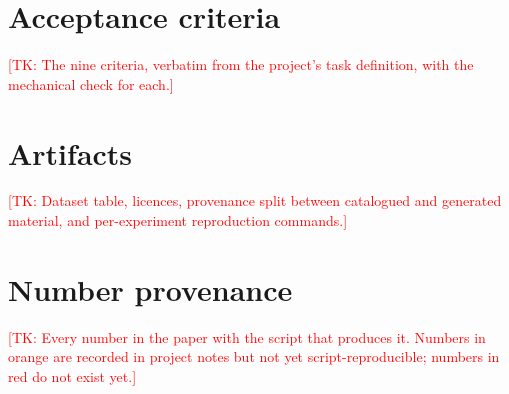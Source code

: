 \documentclass[11pt]{article}
\newif\ifprovenance\provenancetrue
\newcommand{\tk}[1]{\ifprovenance\textcolor{red}{[TK: #1]}\else#1\fi}
\begin{document}


\appendix

\section{Acceptance criteria}
\label{app:criteria}
\tk{The nine criteria, verbatim from the project's task definition, with the
mechanical check for each.}

\section{Artifacts}
\label{app:artifacts}
\tk{Dataset table, licences, provenance split between catalogued and generated
material, and per-experiment reproduction commands.}

\section{Number provenance}
\label{app:provenance}
\tk{Every number in the paper with the script that produces it. Numbers in
orange are recorded in project notes but not yet script-reproducible; numbers
in red do not exist yet.}
\end{document}
